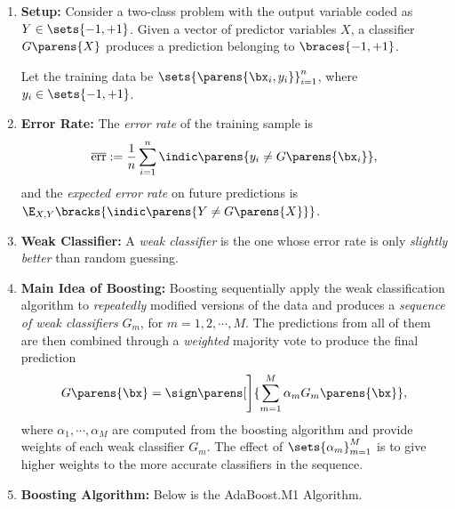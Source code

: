 \documentclass[12pt]{article}
\begin{document}
\begin{enumerate}[label=\textbf{\arabic*.}]

	\item \textbf{Setup:} Consider a two-class problem with the output variable coded as $Y \in \sets{-1, +1}$. Given a vector of predictor variables $X$, a classifier $G \parens{X}$ produces a prediction belonging to $\braces{-1, +1}$. 
	
	Let the training data be $\sets{\parens{\bx_i, y_i}}_{i=1}^n$, where $y_i \in \sets{-1, +1}$. 
	
	\item \textbf{Error Rate:} The \emph{error rate} of the training sample is 
	\begin{align*}
		\overline{\mathrm{err}} := \frac{1}{n} \sum_{i=1}^n \indic \parens{y_i \ne G \parens{\bx_i}}, 
	\end{align*}
	and the \emph{expected error rate} on future predictions is $\E_{X, Y} \bracks{\indic \parens{Y \ne G \parens{X}}}$. 
	
	\item \textbf{Weak Classifier:} A \textit{weak classifier} is the one whose error rate is only \textit{slightly better} than random guessing. 
	
	\item \textbf{Main Idea of Boosting:} Boosting sequentially apply the weak classification algorithm to \textit{repeatedly} modified versions of the data and produces a \textit{sequence of weak classifiers} $G_m$, for $ m = 1, 2, \cdots, M $. The predictions from all of them are then combined through a \textit{weighted} majority vote to produce the final prediction 
	\begin{align}
		G \parens{\bx} = \sign \parens[\Bigg]{\sum_{m=1}^M \alpha_m G_m \parens{\bx}}, 
	\end{align}
	where $\alpha_1, \cdots, \alpha_M$ are computed from the boosting algorithm and provide weights of each weak classifier $G_m$. The effect of $\sets{\alpha_m}_{m=1}^M$ is to give higher weights to the more accurate classifiers in the sequence. 
	
	\item \textbf{Boosting Algorithm:} Below is the AdaBoost.M1 Algorithm. 


\end{enumerate}
\end{document}
